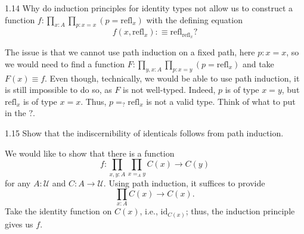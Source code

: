 \documentclass[14pt]{extarticle}
\newcommand{\0}{{\mathbf 0}}
\newcommand{\1}{{\mathbf 1}}
\newcommand{\2}{{\mathbf 2}}
\newcommand{\UU}{{\mathcal U}}
\newcommand{\refl}{\mathrm{refl}}
\newcommand{\id}{\mathrm{id}}
\begin{document}
\begin{prob}{1.14}{}
Why do induction principles for identity types not allow us to construct a function $f : \prod_{x:A}\prod_{p : x=x}(p = \refl_x)$ with the defining equation \[f(x,\refl_x) : \equiv \refl_{\refl_x}?\]
\end{prob}

The issue is that we cannot use path induction on a fixed path, here $p : x = x$, so we would need to find a function $F : \prod_{y,x:A}\prod_{p : x=y}(p = \refl_x)$ and take $F(x) \equiv f$. Even though, technically, we would be able to use path induction, it is still impossible to do so, as $F$ is not well-typed. Indeed, $p$ is of type $x = y$, but $\refl_x$ is of type $x = x$. Thus, $p =_{?} \refl_x$ is not a valid type. Think of what to put in the $?$. 

\begin{prob}{1.15}{}
Show that the indiscernibility of identicals follows from path induction.
\end{prob}
We would like to show that there is a function 
\[f : \prod_{x,y : A} \prod_{x =_A y} C(x) \to C(y)\] for any $A : \UU$ and $C : A \to \UU$. Using path induction, it suffices to provide
\[\prod_{x : A} C(x) \to C(x).\] Take the identity function on $C(x)$, i.e., $\id_{C(x)}$; thus, the induction principle gives us $f$.
\end{document}
